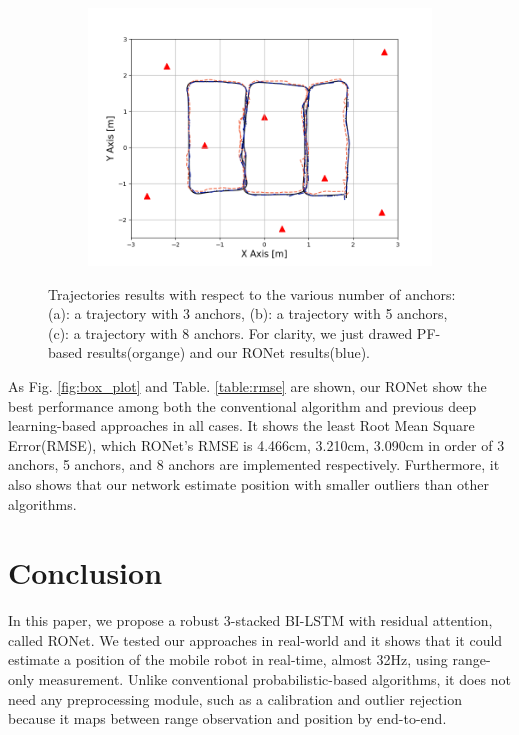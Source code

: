 \documentclass[letterpaper, 10 pt, conference]{ieeeconf}  %
\begin{document}
\begin{figure}[h]
	\begin{subfigure}[b]{0.32\textwidth}
		\includegraphics[width=\textwidth]{image/trajectory_8}
		\caption{}
		\label{fig:anchor_8}
	\end{subfigure}
	\caption{Trajectories results with respect to the various number of anchors: (a): a trajectory with 3 anchors, (b): a trajectory with 5 anchors, (c): a trajectory with 8 anchors. For clarity, we just drawed PF-based results(organge) and our RONet results(blue).}\label{fig:trajectories_358}
\end{figure}

As Fig. \ref{fig:box_plot} and Table. \ref{table:rmse} are shown, our RONet show the best performance among both the conventional algorithm and previous deep learning-based approaches in all cases. It shows the least Root Mean Square Error(RMSE), which RONet's RMSE is 4.466cm, 3.210cm, 3.090cm in order of 3 anchors, 5 anchors, and 8 anchors are implemented respectively. Furthermore, it also shows that our network estimate position with smaller outliers than other algorithms. 

\section{Conclusion}

In this paper, we propose a robust 3-stacked BI-LSTM with residual attention, called RONet. We tested our approaches in real-world and it shows that it could estimate a position of the mobile robot in real-time, almost 32Hz, using range-only measurement. Unlike conventional probabilistic-based algorithms, it does not need any preprocessing module, such as a calibration and outlier rejection because it maps between range observation and position by end-to-end.
\end{document}

